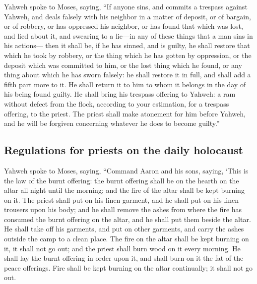  Yahweh spoke to Moses, saying,  ``If anyone
sins, and commits a trespass against Yahweh, and deals falsely with his
neighbor in a matter of deposit, or of bargain, or of robbery, or has
oppressed his neighbor,  or has found that which was lost,
and lied about it, and swearing to a lie---in any of these things that a
man sins in his actions---  then it shall be, if he has
sinned, and is guilty, he shall restore that which he took by robbery,
or the thing which he has gotten by oppression, or the deposit which was
committed to him, or the lost thing which he found,  or
any thing about which he has sworn falsely: he shall restore it in full,
and shall add a fifth part more to it. He shall return it to him to whom
it belongs in the day of his being found guilty.  He shall
bring his trespass offering to Yahweh: a ram without defect from the
flock, according to your estimation, for a trespass offering, to the
priest.  The priest shall make atonement for him before
Yahweh, and he will be forgiven concerning whatever he does to become
guilty.''

\hypertarget{regulations-for-priests-on-the-daily-holocaust}{%
\subsection{Regulations for priests on the daily
holocaust}\label{regulations-for-priests-on-the-daily-holocaust}}

 Yahweh spoke to Moses, saying,  ``Command
Aaron and his sons, saying, `This is the law of the burnt offering: the
burnt offering shall be on the hearth on the altar all night until the
morning; and the fire of the altar shall be kept burning on it.
 The priest shall put on his linen garment, and he shall
put on his linen trousers upon his body; and he shall remove the ashes
from where the fire has consumed the burnt offering on the altar, and he
shall put them beside the altar.  He shall take off his
garments, and put on other garments, and carry the ashes outside the
camp to a clean place.  The fire on the altar shall be
kept burning on it, it shall not go out; and the priest shall burn wood
on it every morning. He shall lay the burnt offering in order upon it,
and shall burn on it the fat of the peace offerings. 
Fire shall be kept burning on the altar continually; it shall not go
out.

